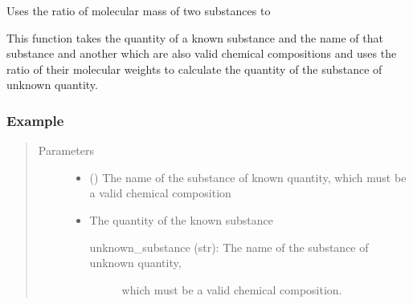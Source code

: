 \documentclass[a4paper,10pt,english]{sphinxmanual}
\begin{document}
\begin{fulllineitems}
\label{\detokenize{calculators:calculators.MolMassRatio}}
Uses the ratio of molecular mass of two substances to

This function takes the quantity of a known substance and the name of
that substance and another which are also valid chemical compositions
and uses the ratio of their molecular weights to calculate the quantity
of the substance of unknown quantity.
\subsubsection*{Example}

\begin{sphinxVerbatim}[commandchars=\\\{\}]
  
\end{sphinxVerbatim}

\begin{sphinxVerbatim}[commandchars=\\\{\}]
  
\end{sphinxVerbatim}
\begin{quote}\begin{description}
\item[{Parameters}] \leavevmode\begin{itemize}
\item {} 
 () \textendash{} The name of the substance of known quantity,
which must be a valid chemical composition

\item {} 
 \textendash{} 
The quantity of the known substance
\begin{description}
\item[{unknown\_substance (str): The name of the substance of unknown quantity,}] \leavevmode
which must be a valid chemical composition.

\end{description}


\end{itemize}

\end{description}\end{quote}

\end{fulllineitems}
\end{document}
